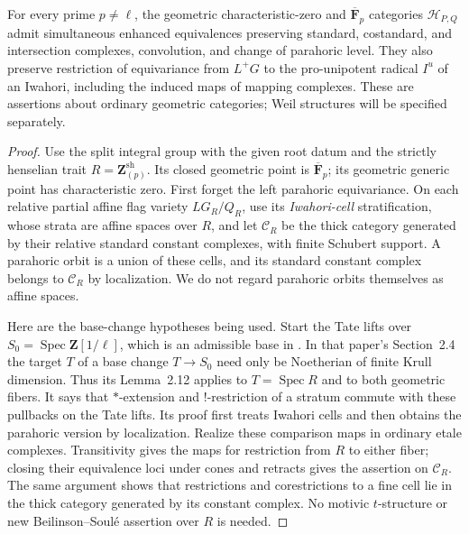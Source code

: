 \begin{lemma}\label{cat:specialization}
For every prime $p\ne\ell$, the geometric characteristic-zero and
$\overline{\mathbf F}_p$ categories $\mathscr H_{P,Q}$ admit simultaneous
enhanced equivalences preserving standard, costandard, and intersection
complexes, convolution, and change of parahoric level. They also preserve
restriction of equivariance from $L^+G$ to the pro-unipotent radical $I^u$
of an Iwahori, including the induced maps of mapping complexes.
These are assertions about ordinary geometric categories; Weil structures
will be specified separately.
\end{lemma}

\begin{proof}
Use the split integral group with the given root datum and the strictly
henselian trait $R=\mathbf Z_{(p)}^{\mathrm{sh}}$. Its closed geometric
point is $\overline{\mathbf F}_p$; its geometric generic point has
characteristic zero. First forget the left parahoric equivariance.
On each relative partial affine flag variety $LG_R/Q_R$, use its
\emph{Iwahori-cell} stratification, whose strata are affine spaces over
$R$, and let $\mathscr C_R$ be the thick category generated by their
relative standard constant complexes, with finite Schubert support.
A parahoric orbit is a union of these cells, and its standard constant
complex belongs to $\mathscr C_R$ by localization. We do not regard
parahoric orbits themselves as affine spaces.

Here are the base-change hypotheses being used. Start the Tate lifts
over $S_0=\operatorname{Spec}\mathbf Z[1/\ell]$, which is an admissible
base in \cite[Notation~2.1]{RicharzScholbach}. In that paper's
Section~2.4 the target $T$ of a base change $T\to S_0$ need only be
Noetherian of finite Krull dimension. Thus its Lemma~2.12 applies to
$T=\operatorname{Spec}R$ and to both geometric fibers. It says that
$*$-extension and $!$-restriction of a stratum commute with these
pullbacks on the Tate lifts. Its proof first treats Iwahori cells and
then obtains the parahoric version by localization. Realize these
comparison maps in ordinary etale complexes. Transitivity gives the
maps for restriction from $R$ to either fiber; closing their
equivalence loci under cones and retracts gives the assertion on
$\mathscr C_R$. The same argument shows that restrictions and
corestrictions to a fine cell lie in the thick category generated by
its constant complex. No motivic $t$-structure or new
Beilinson--Soul\'e assertion over $R$ is needed.


\end{proof}
